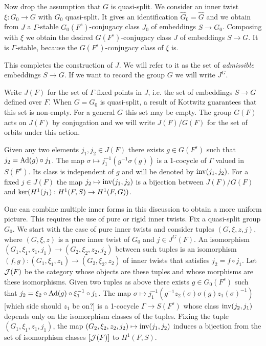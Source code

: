 \documentclass{article}
\theoremstyle{definition}
\numberwithin{equation}{section}
\renewcommand{\-}{\hyp{}}
\newcommand{\warn}[1]{{\leavevmode\color{red}[#1]}}
\begin{document}
Now drop the assumption that $G$ is quasi-split. We consider an inner twist $\xi : G_0 \to G$ with $G_0$ quasi-split. It gives an identification $\hat G_0=\hat G$ and we obtain from $\hat J$ a $\Gamma$-stable $G_0(F^s)$-conjugacy class $J_0$ of embeddings $S \to G_0$. Composing with $\xi$ we obtain the desired $G(F^s)$-conjugacy class $J$ of embeddings $S \to G$. It is $\Gamma$-stable, because the $G(F^s)$-conjugacy class of $\xi$ is.

This completes the construction of $J$. We will refer to it as the set of \emph{admissible} embeddings $S \to G$. If we want to record the group $G$ we will write $J^G$.

Write $J(F)$ for the set of $\Gamma$-fixed points in $J$, i.e. the set of embeddings $S \to G$ defined over $F$. When $G=G_0$ is quasi-split, a result of Kottwitz \cite[Corollary 2.2]{Kot82} guarantees that this set is non-empty. For a general $G$ this set may be empty. The group $G(F)$ acts on $J(F)$ by conjugation and we will write $J(F)/G(F)$ for the set of orbits under this action.

Given any two elements $j_1,j_2 \in J(F)$ there exists $g \in G(F^s)$ such that $j_2 = \textrm{Ad}(g)\circ j_1$. The map $\sigma \mapsto j_1^{-1}(g^{-1}\sigma(g))$ is a 1-cocycle of $\Gamma$ valued in $S(F^s)$. Its class is independent of $g$ and will be denoted by $\textrm{inv}(j_1,j_2)$. For a fixed $j \in J(F)$ the map $j_2 \mapsto \textrm{inv}(j_1,j_2)$ is a bijection between $J(F)/G(F)$ and $\textrm{ker}(H^1(j_1) : H^1(F,S) \to H^1(F,G))$.

One can combine multiple inner forms in this discussion to obtain a more uniform picture. This requires the use of pure or rigid inner twists. Fix a quasi-split group $G_0$. We start with the case of pure inner twists and consider tuples $(G,\xi,z,j)$, where $(G,\xi,z)$ is a pure inner twist of $G_0$ and $j \in J^G(F)$. An isomorphism $(G_1,\xi_1,z_1,j_1) \to (G_2,\xi_2,z_2,j_2)$ between such tuples is an isomorphism $(f,g) : (G_1,\xi_1,z_1) \to (G_2,\xi_2,z_2)$ of inner twists that satisfies $j_2=f\circ j_1$. Let $\mathcal{J}(F)$ be the category whose objects are these tuples and whose morphisms are these isomorphisms. Given two tuples as above there exists $g \in G_0(F^s)$ such that $j_2 = \xi_2 \circ \textrm{Ad}(g)\circ\xi_1^{-1}\circ j_1$. The map $\sigma \mapsto j_1^{-1}(g^{-1}z_2(\sigma)\sigma(g)z_1(\sigma)^{-1})$ \warn{which side should $z_1$ be on?} is a 1-cocycle $\Gamma \to S(F^s)$ whose class $\textrm{inv}(j_2,j_1)$ depends only on the isomorphism classes of the tuples. Fixing the tuple $(G_1,\xi_1,z_1,j_1)$, the map $(G_2,\xi_2,z_2,j_2) \mapsto \textrm{inv}(j_1,j_2)$ induces a bijection from the set of isomorphism classes $[\mathcal{J}(F)]$ to $H^1(F,S)$.
\end{document}
